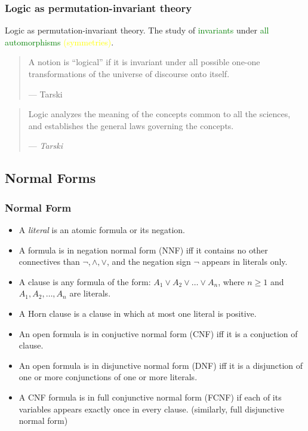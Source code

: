 \documentclass[UTF8,11pt,colorlinks,compress,openany]{beamer}%
\begin{document}
\begin{frame}\frametitle{Logic as permutation-invariant theory}
	\begin{block}{Logic as permutation-invariant theory.}
		The study of \textcolor{green}{invariants} under \textcolor{green}{all automorphisms} \textcolor{yellow}{(symmetries)}.
	\end{block}
	\begin{quote}
		A notion is ``logical'' if it is invariant under all possible one-one transformations of the universe of discourse onto itself.\par
		\hfill --- {Tarski}
	\end{quote}
	\begin{quote}
		Logic analyzes the meaning of the concepts common to all the sciences, and establishes the general laws governing the concepts.\par\hfill --- \textsl{Tarski}
	\end{quote}
\end{frame}

\subsection{Normal Forms}

\begin{frame}\frametitle{Normal Form}
	\begin{itemize}
		\item A \emph{literal} is an atomic formula or its negation.
		\item A formula is in negation normal form (NNF) iff it contains no other connectives than $\neg, \wedge, \vee$, and the negation sign $\neg$ appears in literals only.
		\item A clause is any formula of the form: $A_1\vee A_2\vee\dots\vee A_n$, where $n\geq 1$ and $A_1, A_2,\dots, A_n$ are literals.
		\item A Horn clause is a clause in which at most one literal is positive.
		\item An open formula is in conjuctive normal form (CNF) iff it is a conjuction of clause.
		\item An open formula is in disjunctive normal form (DNF) iff it is a disjunction of one or more conjunctions of one or more literals.
		\item A CNF formula is in full conjunctive normal form (FCNF) if each of its variables appears exactly once in every clause. (similarly, full disjunctive normal form)
	\end{itemize}
\end{frame}
\end{document}
